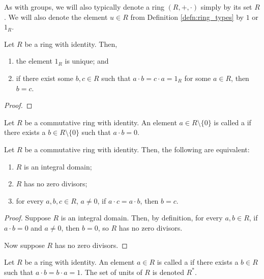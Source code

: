 As with groups, we will also typically denote a ring $ (R,+,\cdot) $ simply by its set $ R $. We will also denote the element $ u\in R $ from Definition \ref{defn:ring_types} by $ 1 $ or $ 1_R $.

\begin{prop}
Let $ R $ be a ring with identity. Then,
\begin{enumerate}
    \item the element $ 1_R $ is unique; and
    \item if there exist some $ b,c\in R $ such that $ a\cdot b=c\cdot a=1_R $ for some $ a\in R $, then $ b=c $.
\end{enumerate}
\end{prop}
\begin{proof}
\end{proof}

\begin{defn}
Let $ R $ be a commutative ring with identity. An element $ a\in R\setminus\{0\} $ is called a  if there exists a $ b\in R\setminus\{0\} $ such that $ a\cdot b=0 $.
\end{defn}

\begin{prop}
Let $ R $ be a commutative ring with identity. Then, the following are equivalent:
\begin{enumerate}
    \item $ R $ is an integral domain;
    \item $ R $ has no zero divisors;
    \item for every $ a,b,c\in R $, $ a\neq 0 $, if $ a\cdot c=a\cdot b $, then $ b=c $.
\end{enumerate}
\end{prop}
\begin{proof}
Suppose $ R $ is an integral domain. Then, by definition, for every $ a,b\in R $, if $ a\cdot b=0 $ and $ a\neq 0 $, then $ b=0 $, so $ R $ has no zero divisors.

Now suppose $ R $ has no zero divisors.
\end{proof}

\begin{defn}
Let $ R $ be a ring with identity. An element $ a\in R $ is called a  if there exists a $ b\in R $ such that $ a\cdot b=b\cdot a=1 $. The set of units of $ R $ is denoted $ R^* $.
\end{defn}

